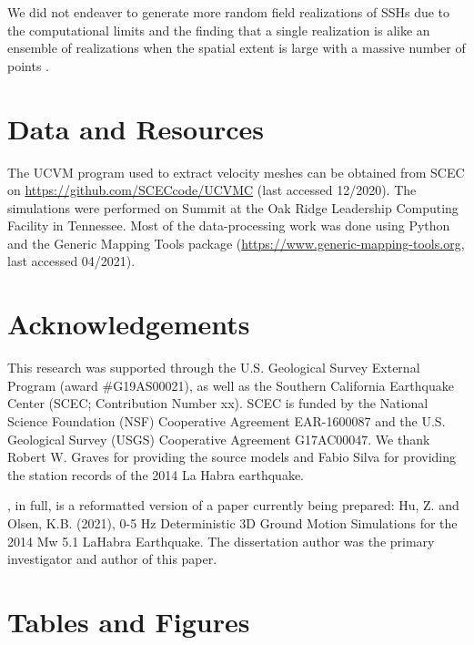 We did not endeaver to generate more random field realizations of SSHs due to the computational limits and the finding that a single realization is alike an ensemble of realizations when the spatial extent is large with a massive number of points \citep{hartzellEffects3DRandom2010}.


\section*{Data and Resources}
The UCVM program used to extract velocity meshes can be obtained from SCEC on \url{https://github.com/SCECcode/UCVMC} (last accessed 12/2020). The simulations were performed on Summit at the Oak Ridge Leadership Computing Facility in Tennessee. Most of the data-processing work was done using Python and the Generic Mapping Tools package (\url{https://www.generic-mapping-tools.org}, last accessed 04/2021).


\section*{Acknowledgements}

This research was supported through the U.S. Geological Survey External Program (award \#G19AS00021), as well as the Southern California Earthquake Center (SCEC; Contribution Number xx). SCEC is funded by the National Science Foundation (NSF) Cooperative Agreement EAR-1600087 and the U.S. Geological Survey (USGS) Cooperative Agreement G17AC00047. We thank Robert W. Graves for providing the source models and Fabio Silva for providing the station records of the 2014 La Habra earthquake.

, in full, is a reformatted version of a paper currently being prepared: Hu, Z. and Olsen, K.B. (2021), 0-5 Hz Deterministic 3D Ground Motion Simulations for the 2014 Mw 5.1 LaHabra Earthquake. The dissertation author was the primary investigator and author of this paper.

\newpage
\section*{Tables and Figures}
%





